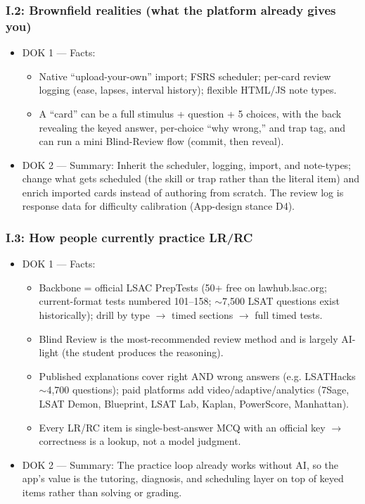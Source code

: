 \documentclass[11pt]{article}
\begin{document}
\subsubsection*{I.2: Brownfield realities (what the platform already gives you)}
\begin{itemize}
\item DOK 1 --- Facts:
\begin{itemize}
\item Native \enquote{upload-your-own} import; FSRS scheduler; per-card review logging (ease, lapses, interval history); flexible HTML/JS note types.
\item A \enquote{card} can be a full stimulus + question + 5 choices, with the back revealing the keyed answer, per-choice \enquote{why wrong,} and trap tag, and can run a mini Blind-Review flow (commit, then reveal).
\end{itemize}
\item DOK 2 --- Summary: Inherit the scheduler, logging, import, and note-types; change what gets scheduled (the skill or trap rather than the literal item) and enrich imported cards instead of authoring from scratch. The review log is response data for difficulty calibration (App-design stance D4).
\end{itemize}
\subsubsection*{I.3: How people currently practice LR/RC}
\begin{itemize}
\item DOK 1 --- Facts:
\begin{itemize}
\item Backbone = official LSAC PrepTests (50+ free on lawhub.lsac.org; current-format tests numbered 101--158; $\sim$7,500 LSAT questions exist historically); drill by type $\rightarrow$ timed sections $\rightarrow$ full timed tests.
\item Blind Review is the most-recommended review method and is largely AI-light (the student produces the reasoning).
\item Published explanations cover right AND wrong answers (e.g. LSATHacks $\sim$4,700 questions); paid platforms add video/adaptive/analytics (7Sage, LSAT Demon, Blueprint, LSAT Lab, Kaplan, PowerScore, Manhattan).
\item Every LR/RC item is single-best-answer MCQ with an official key $\rightarrow$ correctness is a lookup, not a model judgment.
\end{itemize}
\item DOK 2 --- Summary: The practice loop already works without AI, so the app's value is the tutoring, diagnosis, and scheduling layer on top of keyed items rather than solving or grading.
\end{itemize}
\end{document}
